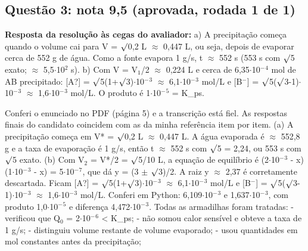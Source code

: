 \documentclass{article}%
\begin{document}
\subsection*{Questão 3: nota 9,5 (aprovada, rodada 1 de 1)}%
\textbf{Resposta da resolução às cegas do avaliador:} a) A precipitação começa quando o volume cai para V = $\surd$0,2 L $\approx$ 0,447 L, ou seja, depois de evaporar cerca de 552 g de água. Como a fonte evapora 1 g/s, t $\approx$ 552 s (553 s com $\surd$5 exato; $\approx$ 5,5$\cdot$10$^2$ s).\newline%
b) Com V = V$_{1}$/2 $\approx$ 0,224 L e cerca de 6,35$\cdot$10$^{-}$$^{4}$ mol de AB precipitado: {[}A?{]} = $\surd$5(1+$\surd$3)$\cdot$10$^{-}$$^3$ $\approx$ 6,1$\cdot$10$^{-}$$^3$ mol/L e {[}B$^{-}${]} = $\surd$5($\surd$3-1)$\cdot$10$^{-}$$^3$ $\approx$ 1,6$\cdot$10$^{-}$$^3$ mol/L. O produto é 1$\cdot$10$^{-}$$^{5}$ = K\_ps.\par %
Conferi o enunciado no PDF (página 5) e a transcrição está fiel. As respostas finais do candidato coincidem com as da minha referência item por item.\newline%
\newline%
(a) A precipitação começa em V* = $\surd$0,2 L $\approx$ 0,447 L. A água evaporada é $\approx$ 552,8 g e a taxa de evaporação é 1 g/s, então t $\approx$ 552 s com $\surd$5 = 2,24, ou 553 s com $\surd$5 exato.\newline%
\newline%
(b) Com V$_{2}$ = V*/2 = $\surd$5/10 L, a equação de equilíbrio é (2$\cdot$10$^{-}$$^3$ - x)(1$\cdot$10$^{-}$$^3$ - x) = 5$\cdot$10$^{-}$$^{7}$, que dá y = (3 $\pm$ $\surd$3)/2. A raiz y $\approx$ 2,37 é corretamente descartada. Ficam {[}A?{]} = $\surd$5(1+$\surd$3)$\cdot$10$^{-}$$^3$ $\approx$ 6,1$\cdot$10$^{-}$$^3$ mol/L e {[}B$^{-}${]} = $\surd$5($\surd$3-1)$\cdot$10$^{-}$$^3$ $\approx$ 1,6$\cdot$10$^{-}$$^3$ mol/L. Conferi em Python: 6,109$\cdot$10$^{-}$$^3$ e 1,637$\cdot$10$^{-}$$^3$, com produto 1,0$\cdot$10$^{-}$$^{5}$ e diferença 4,472$\cdot$10$^{-}$$^3$.\newline%
\newline%
Todas as armadilhas foram tratadas:\newline%
{-} verificou que Q$_{0}$ = 2$\cdot$10$^{-}$$^{6}$ < K\_ps;\newline%
{-} não somou calor sensível e obteve a taxa de 1 g/s;\newline%
{-} distinguiu volume restante de volume evaporado;\newline%
{-} usou quantidades em mol constantes antes da precipitação;\newline%
\end{document}
